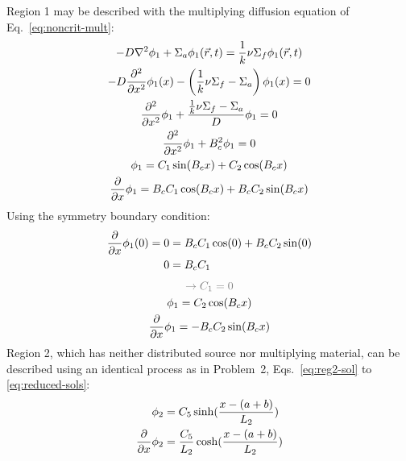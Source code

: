 \documentclass[12pt]{article}
\begin{document}
Region 1 may be described with the multiplying diffusion equation of Eq.~\ref{eq:noncrit-mult}:
\begin{equation}
    \begin{gathered}
        -D\nabla^2\phi_1 + \Sigma_a\phi_1(\vec{r}, t) = \frac{1}{k}\nu\Sigma_f\phi_1(\vec{r}, t)
        \\
        -D\frac{\partial^2}{\partial x^2} \phi_1(x) - \left(\frac{1}{k}\nu\Sigma_f-\Sigma_a\right)\phi_1(x) = 0 \\
        \frac{\partial^2}{\partial x^2}\phi_1 + \frac{\frac{1}{k}\nu\Sigma_f - \Sigma_a}{D}\phi_1 = 0\\
        \frac{\partial^2}{\partial x^2}\phi_1 + B_c^2\phi_1 = 0\\
        \phi_1 = C_1\sin(B_cx) + C_2\cos(B_cx)\\
        \frac{\partial}{\partial x}\phi_1 = B_cC_1\cos(B_cx) + B_cC_2\sin(B_cx)
    \end{gathered}
\end{equation}
Using the symmetry boundary condition:
\begin{equation}
    \begin{aligned}
        \frac{\partial}{\partial x}\phi_1(0) = 0 &= B_cC_1\cos(0) + B_cC_2\sin(0)\\
        0&= B_cC_1\\
    \end{aligned}
\end{equation}
\begin{equation}
    \label{eq:reg1-mult-reduced}
    \begin{gathered}
        \color{gray}\rightarrow C_1=0\\
        \phi_1 = C_2\cos(B_cx)\\
        \ddx\phi_1 = -B_cC_2\sin(B_cx)
    \end{gathered}
\end{equation}
Region 2, which has neither distributed source nor multiplying material, can be described using an identical process as in Problem~2, Eqs.~\ref{eq:reg2-sol} to \ref{eq:reduced-sols}:
\begin{equation}
    \label{eq:reg2-reduced}
    \begin{aligned}
        \phi_2&=C_5\sinh(\frac{x-(a+b)}{L_2})\\
        \frac{\partial}{\partial x}\phi_2&= \frac{C_5}{L_2}\cosh(\frac{x-(a+b)}{L_2})
    \end{aligned}
\end{equation}
\end{document}
